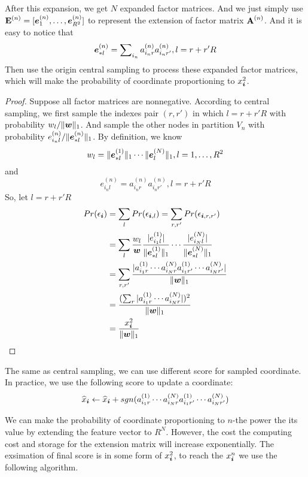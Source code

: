 \documentclass[letterpaper]{article}
\newcommand{\Sca}[3]{{#1}^{(#2)}_{i_#2#3}}%
\newcommand{\V}[1]{{\bm{{\MakeLowercase{#1}}}}}
\newcommand{\VnC}[3]{\V{#1}^{(#2)}_{#3}}
\newcommand{\M}[1]{{\bm{\mathbf{\MakeUppercase{#1}}}}}
\newcommand{\norm}[2]{\|#1\|_{#2}}
\begin{document}
After this expansion, we get $N$ expanded factor matrices. And we just simply use $\M{E}^{(n)}=[\VnC{e}{n}{1},\ldots,\VnC{e}{n}{R^2}]$ to represent the extension of factor matrix $\M{A}^{(n)}$. And it is easy to notice that
\[
\VnC{e}{n}{*l} = \sum\nolimits_{i_n}\Sca{a}{n}{r}\Sca{a}{n}{r'},l=r+r'R
\]
Then use the origin central  sampling to process these expanded factor matrices, which will make the probability of coordinate proportioning to $x_{\V{i}}^2$.
\begin{proof}
Suppose all factor matrices are nonnegative. According to central sampling, we first sample the indexes pair $(r,r')$ in which $l = r+r'R$ with probability $w_l/\norm{\V{w}}{1}$. And sample the other nodes in partition $V_n$ with probability $e^{(n)}_{i_nl}/\norm{\VnC{e}{n}{*l}}{1}$. By definition, we know
\[
w_l = \norm{\VnC{e}{1}{*l}}{1}\cdots \norm{\VnC{e}{N}{l}}{1}, l = 1,\ldots,R^2
\]
and
\[
e^{(n)}_{i_nl} = \Sca{a}{n}{r}\Sca{a}{n}{r'}, l = r+r'R
\]
So, let $l = r+r'R$
\begin{align*}
Pr(\epsilon_{\V{i}}) &= \sum_{l} Pr(\epsilon_{\V{i},l})= \sum_{r,r'} Pr(\epsilon_{\V{i},r,r'})\\
&= \sum_{l} \frac{w_l}{\V{w}}
\frac{|e^{(1)}_{i_1l}|}{\norm{\VnC{e}{1}{*l}}{1}}\cdots
\frac{|e^{(N)}_{i_Nl}|}{\norm{\VnC{e}{N}{*l}}{1}}\\
& = \sum_{r,r'} \frac{|\Sca{a}{1}{r}\cdots\Sca{a}{N}{r}\Sca{a}{1}{r'}\cdots\Sca{a}{N}{r'}|}
{\norm{\V{W}}{1}}\\
& = \frac{(\sum_{r}|\Sca{a}{1}{r}\cdots\Sca{a}{N}{r}|)^2}{\norm{\V{W}}{1}}\\
& = \frac{x_{\V{i}}^2}{\norm{\V{w}}{1}}
\end{align*}
\end{proof}

The same as central sampling, we can use different score for sampled coordinate. In practice, we use the following score to update a coordinate:
\[
\widehat{x}_{\V{i}} \leftarrow \widehat{x}_{\V{i}} +sgn(\Sca{a}{1}{r}\cdots\Sca{a}{N}{r}\Sca{a}{1}{r'}\cdots\Sca{a}{N}{r'})
\]

We can make the probability of coordinate proportioning to $n$-the power the its value by extending the feature vector to $R^N$. However, the cost the computing cost and storage for the extension matrix will increase exponentially. 
The exsimation of final score is in some form of $x^2_{\V{i}}$, to reach the $x^n_{\V{i}}$ we use the following algorithm.
\end{document}
